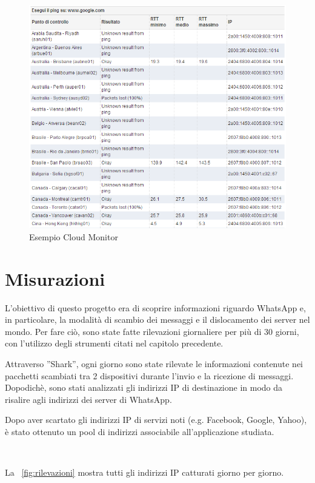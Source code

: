 \documentclass[a4paper,11pt]{book}
\begin{document}
\begin{figure}[!ht]
\centering
\includegraphics[scale = 0.7]{Cloud_Monitor.png}
\caption{Esempio Cloud Monitor}
\end{figure}


\chapter{Misurazioni}

L'obiettivo di questo progetto era di scoprire informazioni riguardo WhatsApp e, in particolare, la modalità di scambio dei messaggi e il dislocamento dei server nel mondo.
Per fare ci\`o, sono state fatte rilevazioni giornaliere per pi\`u di 30 giorni, con l'utilizzo degli strumenti citati nel capitolo precedente.

Attraverso ''Shark'', ogni giorno sono state rilevate le informazioni contenute nei pacchetti scambiati tra 2 dispositivi durante l'invio e la ricezione di messaggi.
Dopodich\`e, sono stati analizzati gli indirizzi IP di destinazione in modo da risalire agli indirizzi dei server di WhatsApp.

Dopo aver scartato gli indirizzi IP di servizi noti (e.g. Facebook, Google, Yahoo), è stato ottenuto un pool di indirizzi associabile all'applicazione studiata.

~

La \figurename ~\ref{fig:rilevazioni} mostra tutti gli indirizzi IP catturati giorno per giorno.  
\end{document}
